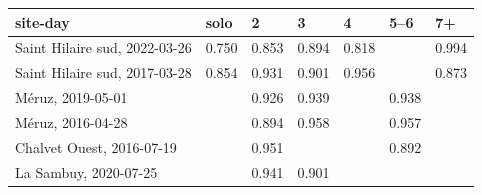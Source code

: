 \begin{tabular}{@{}l l l l l l l@{}}
\toprule
site-day & solo & 2 & 3 & 4 & 5--6 & 7+ \\
\midrule
Saint Hilaire sud, 2022-03-26 & 0.750 & 0.853 & 0.894 & 0.818 &  & 0.994 \\
Saint Hilaire sud, 2017-03-28 & 0.854 & 0.931 & 0.901 & 0.956 &  & 0.873 \\
M\'eruz, 2019-05-01 &  & 0.926 & 0.939 &  & 0.938 &  \\
M\'eruz, 2016-04-28 &  & 0.894 & 0.958 &  & 0.957 &  \\
Chalvet Ouest, 2016-07-19 &  & 0.951 &  &  & 0.892 &  \\
La Sambuy, 2020-07-25 &  & 0.941 & 0.901 &  &  &  \\
\bottomrule
\end{tabular}
